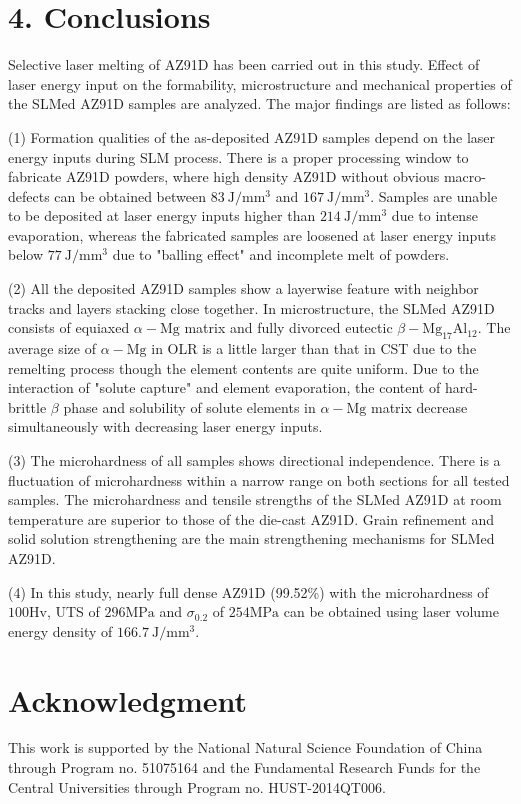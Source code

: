 \documentclass[10pt]{article}
\begin{document}
\section*{4. Conclusions}
Selective laser melting of AZ91D has been carried out in this study. Effect of laser energy input on the formability, microstructure and mechanical properties of the SLMed AZ91D samples are analyzed. The major findings are listed as follows:

(1) Formation qualities of the as-deposited AZ91D samples depend on the laser energy inputs during SLM process. There is a proper processing window to fabricate AZ91D powders, where high density AZ91D without obvious macro-defects can be obtained between $83 \mathrm{~J} / \mathrm{mm}^{3}$ and $167 \mathrm{~J} / \mathrm{mm}^{3}$. Samples are unable to be deposited at laser energy inputs higher than $214 \mathrm{~J} / \mathrm{mm}^{3}$ due to intense evaporation, whereas the fabricated samples are loosened at laser energy inputs below $77 \mathrm{~J} / \mathrm{mm}^{3}$ due to "balling effect" and incomplete melt of powders.

(2) All the deposited AZ91D samples show a layerwise feature with neighbor tracks and layers stacking close together. In microstructure, the SLMed AZ91D consists of equiaxed $\alpha-\mathrm{Mg}$ matrix and fully divorced eutectic $\beta-\mathrm{Mg}_{17} \mathrm{Al}_{12}$. The average size of $\alpha-\mathrm{Mg}$ in OLR is a little larger than that in CST due to the remelting process though the element contents are quite uniform. Due to the interaction of "solute capture" and element evaporation, the content of hard-brittle $\beta$ phase and solubility of solute elements in $\alpha-\mathrm{Mg}$ matrix decrease simultaneously with decreasing laser energy inputs.

(3) The microhardness of all samples shows directional independence. There is a fluctuation of microhardness within a narrow range on both sections for all tested samples. The microhardness and tensile strengths of the SLMed AZ91D at room temperature are superior to those of the die-cast AZ91D. Grain refinement and solid solution strengthening are the main strengthening mechanisms for SLMed AZ91D.

(4) In this study, nearly full dense AZ91D (99.52\%) with the microhardness of $100 \mathrm{Hv}$, UTS of $296 \mathrm{MPa}$ and $\sigma_{0.2}$ of $254 \mathrm{MPa}$ can be obtained using laser volume energy density of $166.7 \mathrm{~J} / \mathrm{mm}^{3}$.

\section*{Acknowledgment}
This work is supported by the National Natural Science Foundation of China through Program no. 51075164 and the Fundamental Research Funds for the Central Universities through Program no. HUST-2014QT006.
\end{document}
